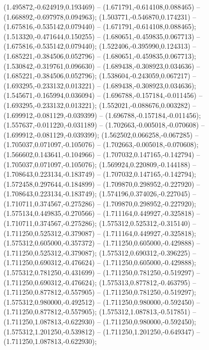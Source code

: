  (1.495872,-0.624919,0.193469) -- (1.671791,-0.614108,0.088465) -- (1.668892,-0.697978,0.094963);
 (1.503771,-0.546870,0.174231) -- (1.675816,-0.535142,0.079440) -- (1.671791,-0.614108,0.088465);
 (1.513320,-0.471644,0.150255) -- (1.680651,-0.459835,0.067713) -- (1.675816,-0.535142,0.079440);
 (1.522406,-0.395990,0.124313) -- (1.685221,-0.384506,0.052796) -- (1.680651,-0.459835,0.067713);
 (1.530842,-0.319761,0.096630) -- (1.689438,-0.308923,0.034636) -- (1.685221,-0.384506,0.052796);
 (1.538604,-0.243059,0.067217) -- (1.693295,-0.233132,0.013221) -- (1.689438,-0.308923,0.034636);
 (1.545671,-0.165994,0.036094) -- (1.696788,-0.157184,-0.011456) -- (1.693295,-0.233132,0.013221);
 (1.552021,-0.088676,0.003282) -- (1.699912,-0.081129,-0.039399) -- (1.696788,-0.157184,-0.011456);
 (1.557637,-0.011220,-0.031189) -- (1.702663,-0.005018,-0.070608) -- (1.699912,-0.081129,-0.039399);
 (1.562502,0.066258,-0.067285) -- (1.705037,0.071097,-0.105076) -- (1.702663,-0.005018,-0.070608);
 (1.566602,0.143641,-0.104966) -- (1.707032,0.147165,-0.142794) -- (1.705037,0.071097,-0.105076);
 (1.569924,0.220809,-0.144188) -- (1.708643,0.223134,-0.183749) -- (1.707032,0.147165,-0.142794);
 (1.572458,0.297644,-0.184899) -- (1.709870,0.298952,-0.227920) -- (1.708643,0.223134,-0.183749);
 (1.574196,0.374026,-0.227045) -- (1.710711,0.374567,-0.275286) -- (1.709870,0.298952,-0.227920);
 (1.575134,0.449835,-0.270566) -- (1.711164,0.449927,-0.325818) -- (1.710711,0.374567,-0.275286);
 (1.575312,0.525312,-0.315140) -- (1.711250,0.525312,-0.379087) -- (1.711164,0.449927,-0.325818);
 (1.575312,0.605000,-0.357372) -- (1.711250,0.605000,-0.429888) -- (1.711250,0.525312,-0.379087);
 (1.575312,0.690312,-0.396225) -- (1.711250,0.690312,-0.476624) -- (1.711250,0.605000,-0.429888);
 (1.575312,0.781250,-0.431699) -- (1.711250,0.781250,-0.519297) -- (1.711250,0.690312,-0.476624);
 (1.575313,0.877812,-0.463795) -- (1.711250,0.877812,-0.557905) -- (1.711250,0.781250,-0.519297);
 (1.575312,0.980000,-0.492512) -- (1.711250,0.980000,-0.592450) -- (1.711250,0.877812,-0.557905);
 (1.575312,1.087813,-0.517851) -- (1.711250,1.087813,-0.622930) -- (1.711250,0.980000,-0.592450);
 (1.575312,1.201250,-0.539812) -- (1.711250,1.201250,-0.649347) -- (1.711250,1.087813,-0.622930);
